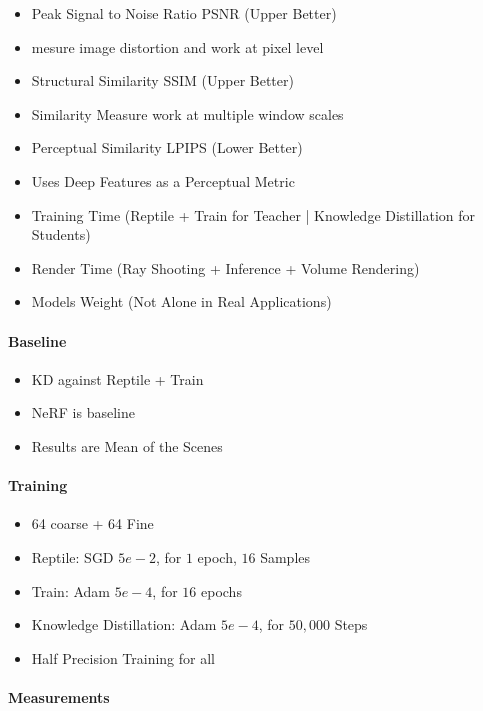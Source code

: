 \begin{itemize}
    \item Peak Signal to Noise Ratio PSNR (Upper Better)
    \item mesure image distortion and work at pixel level
    \item Structural Similarity SSIM (Upper Better)
    \item Similarity Measure work at multiple window scales
    \item Perceptual Similarity LPIPS (Lower Better)
    \item Uses Deep Features as a Perceptual Metric
    \item Training Time (Reptile + Train for Teacher | Knowledge Distillation for Students)
    \item Render Time (Ray Shooting + Inference + Volume Rendering)
    \item Models Weight (Not Alone in Real Applications)
\end{itemize}

\paragraph{Baseline}

\begin{itemize}
    \item KD against Reptile + Train
    \item NeRF is baseline
    \item Results are Mean of the Scenes
\end{itemize}

\paragraph{Training}

\begin{itemize}
    \item 64 coarse + 64 Fine
    \item Reptile: SGD $5e-2$, for $1$ epoch, $16$ Samples
    \item Train: Adam $5e-4$, for $16$ epochs
    \item Knowledge Distillation: Adam $5e-4$, for $50,000$ Steps
    \item Half Precision Training for all
\end{itemize}

\paragraph{Measurements}

